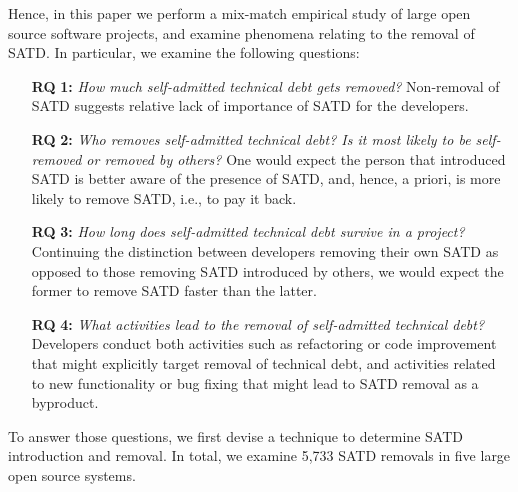 Hence, in this paper we perform a mix-match empirical study of large open source software projects, and examine phenomena relating to the removal of SATD. In particular, we examine the following questions:
\begin{itemize}
	\item[\textbf{RQ}]\textbf{1:} \emph{How much self-admitted technical debt gets removed?} Non-removal of SATD suggests relative lack of importance of SATD for the developers. 
	\item[\textbf{RQ}]\textbf{2:} \emph{Who removes self-admitted technical debt? Is it most likely to be self-removed or removed by others?} One would expect the person that introduced SATD is better aware of the presence of SATD, and, hence, a priori, is more likely to remove SATD, i.e., to pay it back.
	\item[\textbf{RQ}]\textbf{3:} \emph{How long does self-admitted technical debt survive in a project?} Continuing the distinction between developers removing their own SATD as opposed to those removing SATD introduced by others, we would expect the former to remove SATD faster than the latter.
	\item[\textbf{RQ}]\textbf{4:} \emph{What activities lead to the removal of self-admitted technical debt?} Developers conduct both activities such as refactoring or code improvement that might explicitly target removal of technical debt, and activities related to new functionality or bug fixing that might lead to SATD removal as a byproduct.
\end{itemize}
To answer those questions, we first devise a technique to determine SATD introduction and removal. In total, we examine 5,733 SATD removals in five large open source systems.



